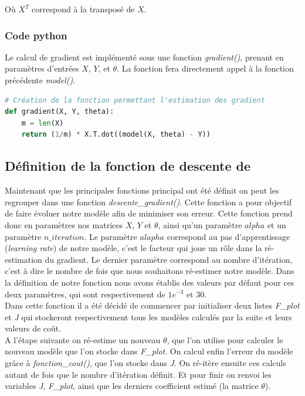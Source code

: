\documentclass[french]{article}
\begin{document}
\noindent Où $X^{T}$ correspond à la transposé de $X$.

\subsubsection{Code python}

Le calcul de gradient est implémenté sous une fonction \textit{gradient()}, prenant en paramètres d'entrées  $X$, $Y$, et $\theta$. La fonction fera directement appel à la fonction précédente \textit{model()}.\\

\begin{lstlisting}[language=Python]
# Création de la fonction permettant l'estimation des gradient
def gradient(X, Y, theta):
    m = len(X)
    return (1/m) * X.T.dot((model(X, theta) - Y))
\end{lstlisting}

\subsection{Définition de la fonction de descente de }

Maintenant que les principales fonctions principal ont été définit on peut les regrouper dans une fonction \textit{descente\_gradient()}. Cette fonction a pour objectif de faire évoluer notre modèle afin de minimiser son erreur. Cette fonction prend donc en paramètres nos matrices $X$, $Y$ et $\theta$, ainsi qu'un paramètre $alpha$ et un paramètre $n\_iteration$. Le paramètre $alapha$ correspond au pas d'apprentissage (\textit{learning rate}) de notre modèle, c'est le facteur qui joue un rôle dans la ré-estimation du gradient. Le dernier paramètre correspond au nombre d'itération, c'est à dire le nombre de fois que nous souhaitons ré-estimer notre modèle. Dans la définition de notre fonction nous avons établis des valeurs par défaut pour ces deux paramètres, qui sont respectivement de $1e^{-3}$ et $30$.\\


\noindent Dans cette fonction il a été décidé de commencer par initialiser deux listes \textit{F\_plot} et \textit{J} qui stockeront respectivement tous les modèles calculés par la suite et leurs valeurs de coût. \\

\noindent A l'étape suivante on ré-estime un nouveau $\theta$, que l'on utilise pour calculer le nouveau modèle que l'on stocke dans \textit{F\_plot}. On calcul enfin l'erreur du modèle grâce à \textit{fonction\_cout()}, que l'on stocke dans \textit{J}. On ré-itère ensuite ces calculs autant de fois que le nombre d'itération définit. Et pour finir on renvoi les variables \textit{J}, \textit{F\_plot}, ainsi que les derniers coefficient estimé (la matrice $\theta$).\\
\end{document}
